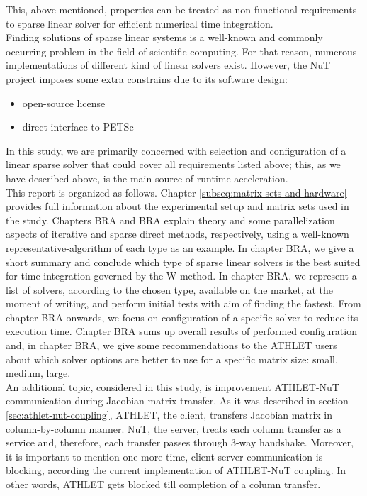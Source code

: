 This, above mentioned, properties can be treated as non-functional requirements to sparse linear solver for efficient numerical time integration.\\

 
Finding solutions of sparse linear systems is a well-known and commonly occurring problem in the field of scientific computing. For that reason, numerous implementations of different kind of linear solvers exist. However, the NuT project imposes some extra constrains due to its software design: \\


\begin{itemize}
	\item open-source license
	\item direct interface to PETSc
\end{itemize}



In this study, we are primarily concerned with selection and configuration of a linear sparse solver that could cover all requirements listed above; this, as we have described above, is the main source of runtime acceleration.\\


This report is organized as follows. Chapter \ref{subseq:matrix-sets-and-hardware} provides full information about the experimental setup and matrix sets  used in the study. Chapters BRA and BRA explain theory and some parallelization aspects of iterative and sparse direct methods, respectively, using a  well-known representative-algorithm of each type as an example. In chapter BRA, we give a short summary and conclude which type of sparse linear solvers is the best suited for time integration governed by the W-method. In chapter BRA, we represent a list of solvers, according to the chosen type, available on the market, at the moment of writing, and perform initial tests with aim of finding the fastest. From chapter BRA onwards, we focus on configuration of a specific solver to reduce its execution time. Chapter BRA sums up overall results of performed configuration and, in chapter BRA, we give some recommendations to the ATHLET users about which solver options are better to use for a specific matrix size: small, medium, large.\\


An additional topic, considered in this study, is improvement ATHLET-NuT communication during Jacobian matrix transfer. As it was described in section \ref{sec:athlet-nut-coupling}, ATHLET, the client, transfers Jacobian matrix in column-by-column manner. NuT, the server, treats each column transfer as a service and, therefore, each transfer passes through 3-way handshake. Moreover, it is important to mention one more time, client-server communication is blocking, according the current implementation of ATHLET-NuT coupling. In other words, ATHLET gets blocked till completion of a column transfer. \\


